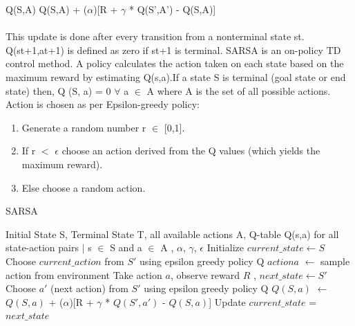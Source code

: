 \documentclass{svproc}
\begin{document}
Q(S,A) \leftarrow Q(S,A) +  ($\alpha$)[R + $\gamma$ * Q(S',A') - Q(S,A)] \\ \\
This update is done after every transition from a nonterminal state st. Q(st+1,at+1) is defined as zero if st+1 is terminal. SARSA is an on-policy TD control method. A policy calculates the action taken on each state based on the maximum reward by estimating Q(s,a).If a state S is terminal (goal state or end state) then, Q (S, a) = 0 $\forall$ a $\in$ A where A is the set of all possible actions. \newline
Action is chosen as per Epsilon-greedy policy:
\begin{enumerate}
    \item Generate a random number r $\in$ [0,1].
    \item If r $<$ $\epsilon$ choose an action derived from the Q values (which yields the maximum reward).
    \item Else choose a random action.
\end{enumerate}


\begin{algorithm}
\caption{SARSA}
\begin{algorithmic}[1]
\REQUIRE Initial State S, Terminal State T, all available actions A, Q-table Q(s,a) for all state-action pairs $\mid$ s $\in$ S and a $\in$ A , $\alpha$, $\gamma$, $\epsilon$
\STATE Initialize $current\_state \leftarrow  S$
\STATE Choose $current\_action$  from $S'$ using epsilon greedy policy Q
\REPEAT
\STATE $action a$ $\leftarrow$ sample action from environment
\STATE Take action $a$, observe reward $R$ , $next\_state \leftarrow S'$
\STATE Choose $a'$ (next action) from $S'$ using epsilon greedy policy Q
\STATE $Q(S,a)$ $\leftarrow$  $Q(S,a)$ +  ($\alpha$)[R + $\gamma$ * $Q(S',a')$ - $Q(S,a)$]
\STATE Update $current\_state$ = $next\_state$
\end{algorithmic}
\end{algorithm}

\newpage
\end{document}
